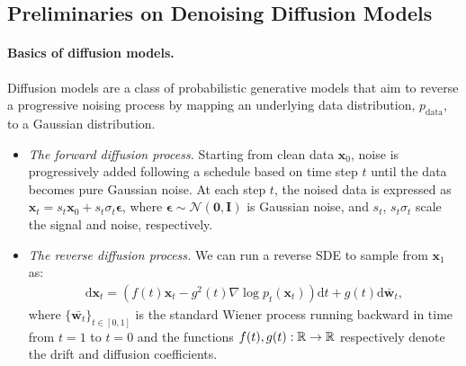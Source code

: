  \subsection{Preliminaries on Denoising Diffusion Models}\label{subsec:diffusion_prelim}

\paragraph{Basics of diffusion models.} Diffusion models are a class of probabilistic generative models that aim to reverse a progressive noising process by mapping an underlying data distribution, $p_{\text{data}}$, to a Gaussian distribution.
\begin{itemize}[leftmargin=*]
    \item \emph{The forward diffusion process.} Starting from clean data $\bm{x}_0$, noise is progressively added following a schedule based on time step $t$ until the data becomes pure Gaussian noise. At each step $t$, the noised data is expressed as $\bm{x}_t = s_t \bm{x}_0 + s_t\sigma_t \bm{\epsilon}$, where $\bm{\epsilon} \sim \mathcal{N}(\bm{0}, \bm{I})$ is Gaussian noise, and $s_t$, $s_t\sigma_t$ scale the signal and noise, respectively.
    \item \emph{The reverse diffusion process.}  We can run a reverse SDE \citep{anderson1982reverse} to sample from $\bm x_1$ as:
\begin{align*} %
    \mathrm{d}\bm{x}_t = \left(  f(t)\bm{x}_t - g^2(t) \nabla \log p_t(\bm{x}_t)\right) \mathrm{d}t +g(t)\mathrm{d}\bar{\bm{w}}_t,
\end{align*}
where $\{\bar{\bm{w}_t}\}_{t \in [0,1]}$ is the standard Wiener process running backward in time from $t=1$ to $t=0$ and the functions $f(t), g(t): \mathbb{R} \to \mathbb{R}$ respectively denote the drift and diffusion coefficients. 
\end{itemize}

